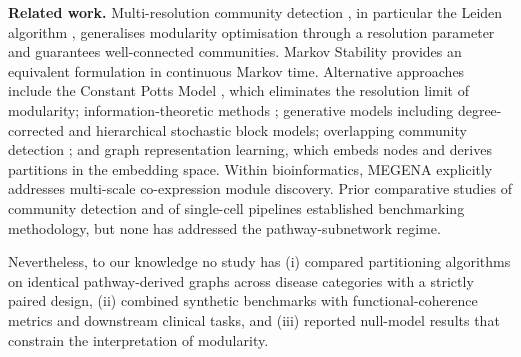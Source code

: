\documentclass[twocolumn,10pt,a4paper]{article}
\begin{document}
\noindent\textbf{Related work.} Multi-resolution community detection \citep{newman2004girvan}, in
particular the Leiden algorithm \citep{traag2019leiden}, generalises modularity optimisation
through a resolution parameter and guarantees well-connected communities. Markov Stability provides an equivalent formulation in continuous Markov time.
Alternative approaches include the Constant Potts Model \citep{traag2011cpm}, which
eliminates the resolution limit of modularity; information-theoretic methods
\citep{rosvall2008infomap}; generative models including degree-corrected and hierarchical
stochastic block models; overlapping community detection \citep{ahn2010link,lancichinetti2011oslom}; and graph representation learning, which embeds nodes and derives
partitions in the embedding space. Within bioinformatics, MEGENA \citep{song2015megena}
explicitly addresses multi-scale co-expression module discovery. Prior comparative studies of community detection and of
single-cell pipelines \citep{luecken2019benchmark} established benchmarking methodology, but
none has addressed the pathway-subnetwork regime.

Nevertheless, to our knowledge no study has (i) compared partitioning algorithms on
identical pathway-derived graphs \citep{lancichinetti2008lfr} across disease categories with
a strictly paired design,
(ii) combined synthetic benchmarks with functional-coherence metrics and downstream
clinical tasks, and (iii) reported null-model results that constrain the interpretation of
modularity.
\end{document}
